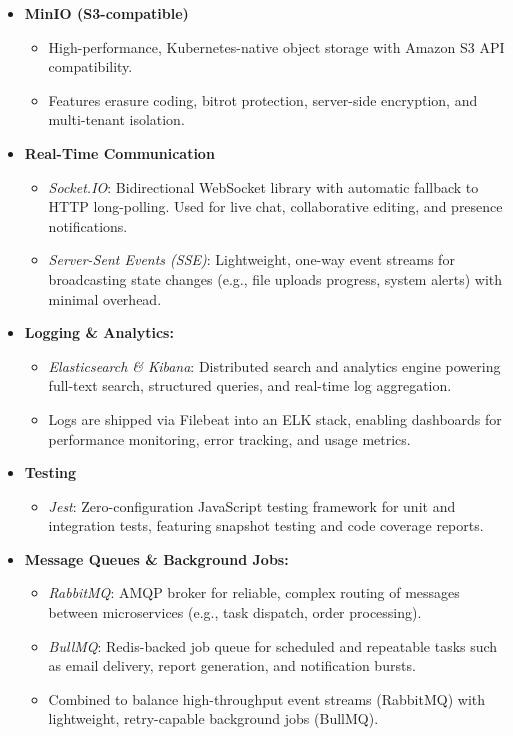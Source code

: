 \begin{itemize}
  \item \textbf{MinIO (S3-compatible)}  
    \begin{itemize}
      \item High-performance, Kubernetes-native object storage with Amazon S3 API compatibility.  
      \item Features erasure coding, bitrot protection, server-side encryption, and multi-tenant isolation.  
    \end{itemize}

  \item \textbf{Real-Time Communication}  
    \begin{itemize}
      \item \emph{Socket.IO}: Bidirectional WebSocket library with automatic fallback to HTTP long-polling. Used for live chat, collaborative editing, and presence notifications.  
      \item \emph{Server-Sent Events (SSE)}: Lightweight, one-way event streams for broadcasting state changes (e.g., file uploads progress, system alerts) with minimal overhead.
    \end{itemize}

  \item \textbf{Logging \& Analytics:}  
    \begin{itemize}
      \item \emph{Elasticsearch \& Kibana}: Distributed search and analytics engine powering full-text search, structured queries, and real-time log aggregation.  
      \item Logs are shipped via Filebeat into an ELK stack, enabling dashboards for performance monitoring, error tracking, and usage metrics.
    \end{itemize}

  \item \textbf{Testing}  
    \begin{itemize}
      \item \emph{Jest}: Zero-configuration JavaScript testing framework for unit and integration tests, featuring snapshot testing and code coverage reports.  
    \end{itemize}

  \item \textbf{Message Queues \& Background Jobs:}  
    \begin{itemize}
      \item \emph{RabbitMQ}: AMQP broker for reliable, complex routing of messages between microservices (e.g., task dispatch, order processing).  
      \item \emph{BullMQ}: Redis-backed job queue for scheduled and repeatable tasks such as email delivery, report generation, and notification bursts.  
      \item Combined to balance high-throughput event streams (RabbitMQ) with lightweight, retry-capable background jobs (BullMQ).
    \end{itemize}
\end{itemize}

